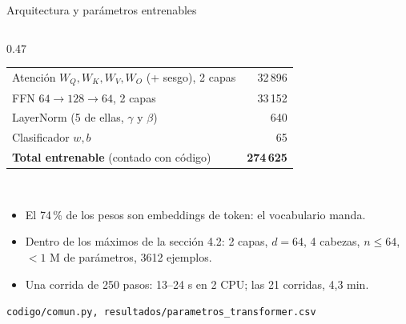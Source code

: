 \documentclass[aspectratio=169, 10pt]{beamer}
\newcommand{\archivo}[1]{{\scriptsize\texttt{#1}}}
\begin{document}
\begin{frame}{Arquitectura y parámetros entrenables}
\begin{columns}[T]
\begin{column}{0.47\textwidth}
\begin{tabular}{@{}lr@{}}
        Atención $W_Q, W_K, W_V, W_O$ (+ sesgo), 2 capas & 32\,896 \\
        FFN $64\to128\to64$, 2 capas & 33\,152 \\
        LayerNorm (5 de ellas, $\gamma$ y $\beta$) & 640 \\
        Clasificador $w, b$ & 65 \\
        \midrule
        \textbf{Total entrenable} (contado con código) & \textbf{274\,625} \\
        \bottomrule
      \end{tabular}\\[6pt]
      \begin{itemize}
        \item El 74\,\% de los pesos son embeddings de token: el vocabulario manda.
        \item Dentro de los máximos de la sección 4.2: 2 capas, $d=64$, 4 cabezas,
              $n\le 64$, $<1$ M de parámetros, 3612 ejemplos.
        \item Una corrida de 250 pasos: 13--24 s en 2 CPU; las 21 corridas, 4,3 min.
      \end{itemize}
      \vfill
      \archivo{codigo/comun.py, resultados/parametros\_transformer.csv}
    \end{column}
  \end{columns}
\end{frame}
\end{document}
